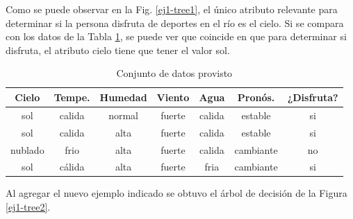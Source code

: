 \documentclass[a4paper]{article}
\begin{document}
Como se puede observar en la Fig. \ref{ej1-tree1}, el único atributo relevante para determinar si la persona disfruta de deportes en el río es el cielo. Si se compara con los datos de la Tabla \ref{tab:dataset-1}, se puede ver que coincide en que para determinar si disfruta, el atributo cielo tiene que tener el valor sol.

\begin{table}[h]
  \centering
  \begin{tabular}{ccccccc}
  Cielo                          & Tempe. & Humedad & Viento & Agua   & Pronós.    & ¿Disfruta?                \\ \hline
  {\color[HTML]{009901} sol}     & calida & normal  & fuerte & calida & estable   & {\color[HTML]{009901} si} \\
  {\color[HTML]{009901} sol}     & calida & alta    & fuerte & calida & estable   & {\color[HTML]{009901} si} \\
  {\color[HTML]{CB0000} nublado} & frio   & alta    & fuerte & calida & cambiante & {\color[HTML]{CB0000} no} \\
  {\color[HTML]{009901} sol}     & cálida & alta    & fuerte & fria   & cambiante & {\color[HTML]{009901} si}
  \end{tabular}
  \caption{Conjunto de datos provisto}
  \label{tab:dataset-1}
  \end{table}

Al agregar el nuevo ejemplo indicado se obtuvo el árbol de decisión de la Figura \ref{ej1-tree2}.
\end{document}
